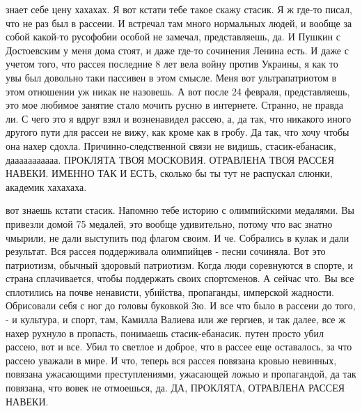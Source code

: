 знает себе цену хахахах. Я вот кстати тебе такое скажу стасик. Я ж где-то
писал, что не раз был в рассеии. И встречал там много нормальных людей, и
вообще за собой какой-то русофобии особой не замечал, представляешь, да. И
Пушкин с Достоевским у меня дома стоят, и даже где-то сочинения Ленина есть. И
даже с учетом того, что рассея последние 8 лет вела войну против Украины, я как
то увы был довольно таки пассивен в этом смысле. Меня вот ультрапатриотом в
этом отношении уж никак не назовешь. А вот после 24 февраля, представляешь, это
мое любимое занятие стало мочить русню в интернете. Странно, не правда ли. С
чего это я вдруг взял и возненавидел рассею, а, да так, что никакого иного
другого пути для рассеи не вижу, как кроме как в гробу. Да так, что хочу чтобы
она нахер сдохла. Причинно-следственной связи не видишь, стасик-ебанасик,
дааааааааааа. ПРОКЛЯТА ТВОЯ МОСКОВИЯ. ОТРАВЛЕНА ТВОЯ РАССЕЯ НАВЕКИ. ИМЕННО ТАК
И ЕСТЬ, сколько бы ты тут не распускал слюнки, академик хахахаха.

вот знаешь кстати стасик. Напомню тебе историю с олимпийскими медалями.  Вы
привезли домой 75 медалей, это вообще удивительно, потому что вас знатно
чмырили, не дали выступить под флагом своим. И че. Собрались в кулак и дали
результат. Вся рассея поддерживала олимпийцев - песни сочиняла. Вот это
патриотизм, обычный здоровый патриотизм. Когда люди соревнуются в спорте, и
страна сплачивается, чтобы поддержать своих спортсменов. А сейчас что. Вы все
сплотились на почве ненависти, убийства, пропаганды, имперской жадности.
Обрисовали себя с ног до головы буковкой Зю. И все что было в рассеии до того,
- и культура, и спорт, там, Камилла Валиева или же гергиев, и так далее, все ж
нахер рухнуло в пропасть, понимаешь стасик-ебанасик. путен просто убил рассею,
вот и все. Убил то светлое и доброе, что в рассее еще оставалось, за что рассею
уважали в мире. И что, теперь вся рассея повязана кровью невинных, повязана
ужасающими преступлениями, ужасающей ложью и пропагандой, да так повязана, что
вовек не отмоешься, да. ДА, ПРОКЛЯТА, ОТРАВЛЕНА РАССЕЯ НАВЕКИ.

